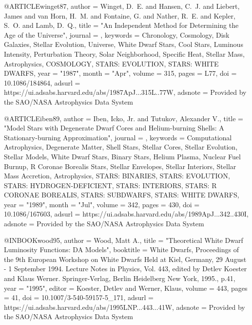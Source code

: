\documentclass[a4paper,fleqn,usenatbib]{mnras}
\begin{document}
{{{{{{{{{{{@ARTICLE{winget87,
       author = {{Winget}, D.~E. and {Hansen}, C.~J. and {Liebert}, James and
         {van Horn}, H.~M. and {Fontaine}, G. and {Nather}, R.~E. and
         {Kepler}, S.~O. and {Lamb}, D.~Q.},
        title = "{An Independent Method for Determining the Age of the Universe}",
      journal = {\apjl},
     keywords = {Chronology, Cosmology, Disk Galaxies, Stellar Evolution, Universe, White Dwarf Stars, Cool Stars, Luminous Intensity, Perturbation Theory, Solar Neighborhood, Specific Heat, Stellar Mass, Astrophysics, COSMOLOGY, STARS: EVOLUTION, STARS: WHITE DWARFS},
         year = "1987",
        month = "Apr",
       volume = {315},
        pages = {L77},
          doi = {10.1086/184864},
       adsurl = {https://ui.adsabs.harvard.edu/abs/1987ApJ...315L..77W},
      adsnote = {Provided by the SAO/NASA Astrophysics Data System}
}

@ARTICLE{iben89,
       author = {{Iben}, Icko, Jr. and {Tutukov}, Alexander V.},
        title = "{Model Stars with Degenerate Dwarf Cores and Helium-burning Shells: A Stationary-burning Approximation}",
      journal = {\apj},
     keywords = {Computational Astrophysics, Degenerate Matter, Shell Stars, Stellar Cores, Stellar Evolution, Stellar Models, White Dwarf Stars, Binary Stars, Helium Plasma, Nuclear Fuel Burnup, R Coronae Borealis Stars, Stellar Envelopes, Stellar Interiors, Stellar Mass Accretion, Astrophysics, STARS: BINARIES, STARS: EVOLUTION, STARS: HYDROGEN-DEFICIENT, STARS: INTERIORS, STARS: R CORONAE BOREALIS, STARS: SUBDWARFS, STARS: WHITE DWARFS},
         year = "1989",
        month = "Jul",
       volume = {342},
        pages = {430},
          doi = {10.1086/167603},
       adsurl = {https://ui.adsabs.harvard.edu/abs/1989ApJ...342..430I},
      adsnote = {Provided by the SAO/NASA Astrophysics Data System}
}

@INBOOK{wood95,
       author = {{Wood}, Matt A.},
        title = "{Theoretical White Dwarf Luminosity Functions: DA Models}",
    booktitle = {White Dwarfs, Proceedings of the 9th European Workshop on White Dwarfs Held at Kiel, Germany, 29 August - 1 September 1994.  Lecture Notes in Physics, Vol. 443, edited by Detlev Koester and Klaus Werner. Springer-Verlag, Berlin Heidelberg New York, 1995., p.41},
         year = "1995",
       editor = {{Koester}, Detlev and {Werner}, Klaus},
       volume = {443},
        pages = {41},
          doi = {10.1007/3-540-59157-5_171},
       adsurl = {https://ui.adsabs.harvard.edu/abs/1995LNP...443...41W},
      adsnote = {Provided by the SAO/NASA Astrophysics Data System}
}

}}}}}}}}}}}
\end{document}
